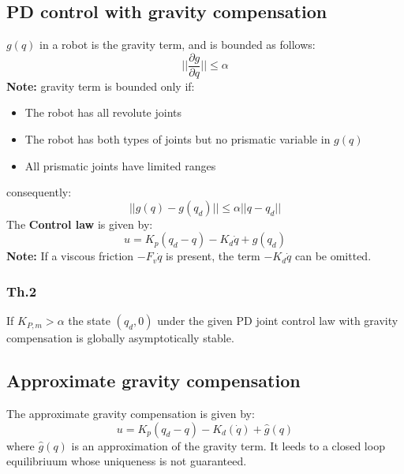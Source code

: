 \documentclass[a4paper,12pt]{article}
\begin{document}
\subsection{PD control with gravity compensation}
$g(q)$ in a robot is the gravity term, and is bounded as follows:
\begin{equation}
    ||\frac{\partial g}{\partial q}|| \leq \alpha
\end{equation}
\textbf{Note:} gravity term is bounded only if:
\begin{itemize}
    \item The robot has all revolute joints
    \item The robot has both types of joints but no prismatic variable in $g(q)$
    \item All prismatic joints have limited ranges
\end{itemize}
consequently:
\begin{equation}
    ||g(q)-g(q_d)|| \leq \alpha ||q-q_d||
\end{equation}
The \textbf{Control law} is given by:
\begin{equation}
    u = K_p(q_d-q) - K_d\dot{q} + g(q_d)
\end{equation}
\textbf{Note:} If a viscous friction $-F_v\dot{q}$ is present,
 the term $-K_d\dot{q}$ can be omitted.\\
\subsubsection{Th.2}
If $K_{P,m} > \alpha$ the state $(q_d, 0)$ under the given
 PD joint control law with gravity compensation is
  globally asymptotically stable.
\subsection{Approximate gravity compensation}
The approximate gravity compensation is given by:
\begin{equation}
    u = K_p(q_d-q) - K_d(\dot{q}) + \hat{g}(q)
\end{equation}
where $\hat{g}(q)$ is an approximation of the gravity term.
It leeds to a closed loop equilibriuum whose uniqueness 
is not guaranteed.
\end{document}
